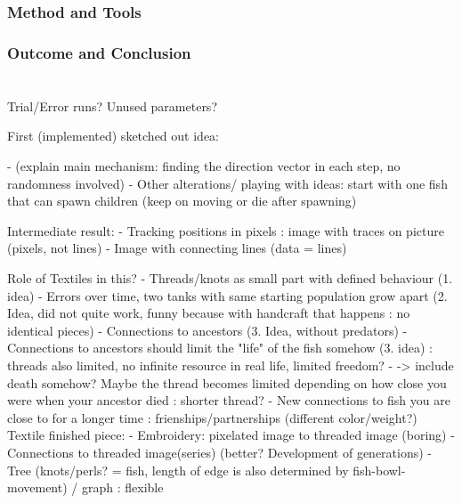 \documentclass{scrartcl}
\begin{document}
\subsubsection{Method and Tools}
\subsubsection{Outcome and Conclusion}

\section{}
\section{}
\subsection{}



Trial/Error runs? Unused parameters?

First (implemented) sketched out idea:

-	(explain main mechanism: finding the direction vector in each step, no randomness involved)
-	Other alterations/ playing with ideas: start with one fish that can spawn children (keep on moving or die after spawning)

Intermediate result:
-	Tracking positions in pixels : image with traces on picture (pixels, not lines)
-	Image with connecting lines (data = lines)

Role of Textiles in this?
-	Threads/knots as small part with defined behaviour (1. idea)
-	Errors over time, two tanks with same starting population grow apart (2. Idea, did not quite work, funny because with handcraft that happens : no identical pieces)
-	Connections to ancestors (3. Idea, without predators)
-	Connections to ancestors should limit the "life" of the  fish somehow (3. idea) : threads also limited, no infinite resource in real life, limited freedom?
-	-> include death somehow? Maybe the thread becomes limited depending on how close you were when your ancestor died : shorter thread?
-	New connections to fish you are close to for a longer time : frienships/partnerships (different color/weight?)
Textile finished piece:
-	Embroidery: pixelated image to threaded image (boring)
-	Connections to threaded image(series) (better? Development of generations)
-	Tree (knots/perls? = fish, length of edge is also determined by fish-bowl-movement) / graph : flexible
\end{document}
